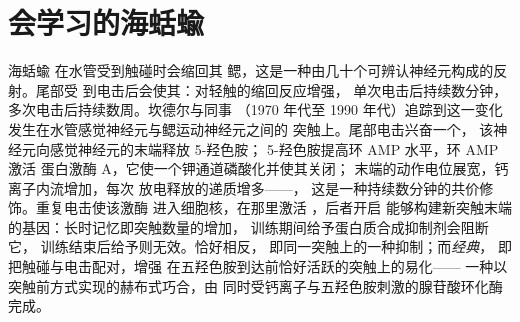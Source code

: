 \section{会学习的海蛞蝓}

\begin{proposition}\label{prop:b3:learning-memory:aplysia}
海蛞蝓 \emph{} 在水管受到触碰时会缩回其
鳃，这是一种由几十个可辨认神经元构成的反射。尾部受
到电击后会使其\emph{}：对轻触的缩回反应增强，
单次电击后持续数分钟，多次电击后持续数周。坎德尔与同事
（1970 年代至 1990 年代）追踪到这一变化发生在水管感觉神经元与鳃运动神经元之间的
突触上。尾部电击兴奋一个，
该神经元向感觉神经元的末端释放 5-羟色胺；
5-羟色胺提高环 AMP 水平，环 AMP 激活
蛋白激酶 A，它使一个钾通道磷酸化并使其关闭；
末端的动作电位展宽，钙离子内流增加，每次
放电释放的递质增多——\emph{}，
这是一种持续数分钟的共价修饰。重复电击使该激酶
进入细胞核，在那里激活 ，后者开启
能够构建新突触末端的基因：长时记忆即突触数量的增加，
训练期间给予蛋白质合成抑制剂会阻断它，
训练结束后给予则无效。\emph{}恰好相反，
即同一突触上的一种抑制；而\emph{经典}，
即把触碰与电击配对，增强
在五羟色胺到达前恰好活跃的突触上的易化——
一种以突触前方式实现的赫布式巧合，由
同时受钙离子与五羟色胺刺激的腺苷酸环化酶完成。
\end{proposition}

